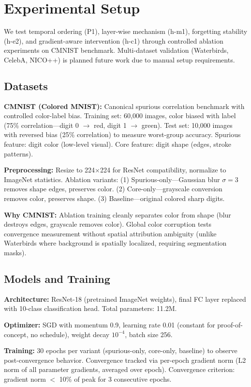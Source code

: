 \section{Experimental Setup}

We test temporal ordering (P1), layer-wise mechanism (h-m1), forgetting stability (h-e2), and gradient-aware intervention (h-c1) through controlled ablation experiments on CMNIST benchmark. Multi-dataset validation (Waterbirds, CelebA, NICO++) is planned future work due to manual setup requirements.

\subsection{Datasets}

\textbf{CMNIST (Colored MNIST):} Canonical spurious correlation benchmark with controlled color-label bias. Training set: 60,000 images, color biased with label (75\% correlation---digit 0 $\rightarrow$ red, digit 1 $\rightarrow$ green). Test set: 10,000 images with reversed bias (25\% correlation) to measure worst-group accuracy. Spurious feature: digit color (low-level visual). Core feature: digit shape (edges, stroke patterns).

\textbf{Preprocessing:} Resize to 224$\times$224 for ResNet compatibility, normalize to ImageNet statistics. Ablation variants: (1) Spurious-only---Gaussian blur $\sigma=3$ removes shape edges, preserves color. (2) Core-only---grayscale conversion removes color, preserves shape. (3) Baseline---original colored sharp digits.

\textbf{Why CMNIST:} Ablation training cleanly separates color from shape (blur destroys edges, grayscale removes color). Global color corruption tests convergence measurement without spatial attribution ambiguity (unlike Waterbirds where background is spatially localized, requiring segmentation masks).

\subsection{Models and Training}

\textbf{Architecture:} ResNet-18 (pretrained ImageNet weights), final FC layer replaced with 10-class classification head. Total parameters: 11.2M.

\textbf{Optimizer:} SGD with momentum 0.9, learning rate 0.01 (constant for proof-of-concept, no schedule), weight decay $10^{-4}$, batch size 256.

\textbf{Training:} 30 epochs per variant (spurious-only, core-only, baseline) to observe post-convergence behavior. Convergence tracked via per-epoch gradient norm (L2 norm of all parameter gradients, averaged over epoch). Convergence criterion: gradient norm $<$ 10\% of peak for 3 consecutive epochs.

